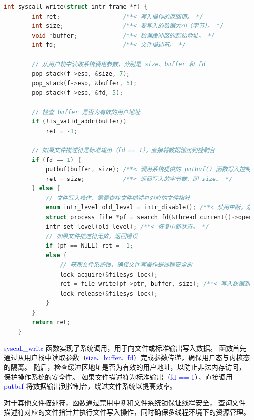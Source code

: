 \documentclass[14pt,a4paper,UTF8,twoside]{article}
\renewcommand{\texttt}[1]{\textcolor{blue}{\ttfamily #1}}
\begin{document}
\begin{lstlisting}[language=C, title= syscall\_write()]
    int syscall_write(struct intr_frame *f) {
        int ret;                  /**< 写入操作的返回值。 */
        int size;                 /**< 要写入的数据大小（字节）。 */
        void *buffer;             /**< 数据缓冲区的起始地址。 */
        int fd;                   /**< 文件描述符。 */
    
        // 从用户栈中读取系统调用参数，分别是 size、buffer 和 fd
        pop_stack(f->esp, &size, 7);
        pop_stack(f->esp, &buffer, 6);
        pop_stack(f->esp, &fd, 5);
    
        // 检查 buffer 是否为有效的用户地址
        if (!is_valid_addr(buffer))
            ret = -1;

        // 如果文件描述符是标准输出（fd == 1），直接将数据输出到控制台
        if (fd == 1) {
            putbuf(buffer, size); /**< 调用系统提供的 putbuf() 函数写入控制台。 */
            ret = size;           /**< 返回写入的字节数，即 size。 */
        } else {
            // 文件写入操作，需要查找文件描述符对应的文件指针
            enum intr_level old_level = intr_disable(); /**< 禁用中断，避免多线程竞争。 */
            struct process_file *pf = search_fd(&thread_current()->opened_files, fd);
            intr_set_level(old_level); /**< 恢复中断状态。 */
            // 如果文件描述符无效，返回错误
            if (pf == NULL) ret = -1;
            else {
                // 获取文件系统锁，确保文件写操作是线程安全的
                lock_acquire(&filesys_lock);
                ret = file_write(pf->ptr, buffer, size); /**< 写入数据到文件，返回写入字节数。 */
                lock_release(&filesys_lock);
            }
        }
        return ret;
    }
\end{lstlisting}

\begin{ctt}

\texttt{syscall\_write} 函数实现了系统调用，用于向文件或标准输出写入数据。
函数首先通过从用户栈中读取参数（\texttt{size、buffer、fd}）完成参数传递，确保用户态与内核态的隔离。
随后，检查缓冲区地址是否为有效的用户地址，以防止非法内存访问，保护操作系统的安全性。
如果文件描述符为标准输出（\texttt{fd == 1}），直接调用 \texttt{putbuf} 将数据输出到控制台，绕过文件系统以提高效率。

\vspace{0.5cm}

对于其他文件描述符，函数通过禁用中断和文件系统锁保证线程安全，
查询文件描述符对应的文件指针并执行文件写入操作，同时确保多线程环境下的资源管理。

\end{ctt}
\end{document}

